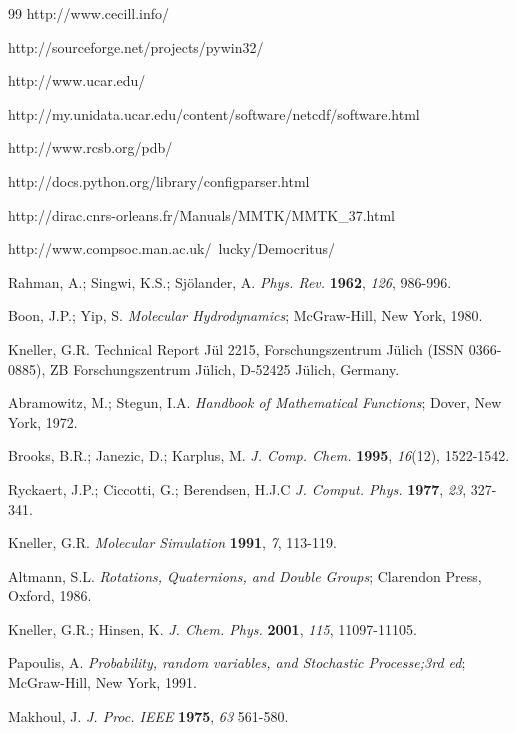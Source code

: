 \documentclass[a4paper,11pt]{article}
\begin{document}
\begin{thebibliography}{99}
 http://www.cecill.info/

 http://sourceforge.net/projects/pywin32/

 http://www.ucar.edu/

 http://my.unidata.ucar.edu/content/software/netcdf/software.html

 http://www.rcsb.org/pdb/

 http://docs.python.org/library/configparser.html

 http://dirac.cnrs-orleans.fr/Manuals/MMTK/MMTK\_37.html

 http://www.compsoc.man.ac.uk/~lucky/Democritus/

 Rahman, A.; Singwi, K.S.; Sj\"olander, A. \textit{Phys. Rev.} \textbf{1962}, \textit{126}, 986-996.

 Boon, J.P.; Yip, S. \textit{Molecular Hydrodynamics}; McGraw-Hill, New York, 1980.

 Kneller, G.R. Technical Report J\"ul 2215, Forschungs\-zen\-trum J\"u\-lich (ISSN 0366-0885),
ZB Forschungs\-zen\-trum J\"ulich, D-52425 J\"ulich, Germany.

 Abramowitz, M.; Stegun, I.A. \textit{Handbook of Mathematical Functions}; Dover, New York, 1972.

 Brooks, B.R.; Janezic, D.; Karplus, M. \textit{J. Comp. Chem.} \textbf{1995}, \textit{16}(12), 1522-1542.

 Ryckaert, J.P.; Ciccotti, G.; Berendsen, H.J.C \textit{J. Comput. Phys.} \textbf{1977}, \textit{23}, 327-341.

 Kneller, G.R. \textit{Molecular Simulation} \textbf{1991}, \textit{7}, 113-119.

 Altmann, S.L. \textit{Rotations, Quaternions, and Double Groups}; Clarendon Press, Oxford, 1986.

 Kneller, G.R.; Hinsen, K. \textit{J. Chem. Phys.} \textbf{2001}, \textit{115}, 11097-11105.

 Papoulis, A. \textit{Probability, random variables, and Stochastic Processe;3rd ed}; McGraw-Hill, New York, 1991.

 Makhoul, J. \textit{J. Proc. IEEE} \textbf{1975}, \textit{63} 561-580.


\end{thebibliography}
\end{document}
